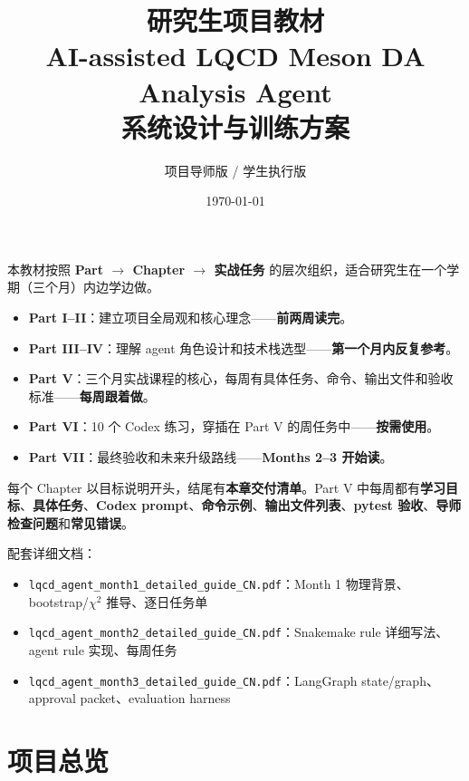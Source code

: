 \documentclass[11pt,a4paper,fontset=fandol]{ctexart}
\title{\bfseries 研究生项目教材\\[4pt]
AI-assisted LQCD Meson DA Analysis Agent\\[4pt]
系统设计与训练方案}
\author{项目导师版 / 学生执行版}
\date{\today}
\begin{document}
\maketitle

\begin{tcolorbox}[colback=blue!3!white,colframe=blue!50!black,title=如何使用本教材]
本教材按照 \textbf{Part $\to$ Chapter $\to$ 实战任务} 的层次组织，适合研究生在一个学期（三个月）内边学边做。

\begin{itemize}
  \item \textbf{Part I--II}：建立项目全局观和核心理念——\textbf{前两周读完}。
  \item \textbf{Part III--IV}：理解 agent 角色设计和技术栈选型——\textbf{第一个月内反复参考}。
  \item \textbf{Part V}：三个月实战课程的核心，每周有具体任务、命令、输出文件和验收标准——\textbf{每周跟着做}。
  \item \textbf{Part VI}：10 个 Codex 练习，穿插在 Part V 的周任务中——\textbf{按需使用}。
  \item \textbf{Part VII}：最终验收和未来升级路线——\textbf{Months 2--3 开始读}。
\end{itemize}

每个 Chapter 以目标说明开头，结尾有\textbf{本章交付清单}。Part V 中每周都有\textbf{学习目标}、\textbf{具体任务}、\textbf{Codex prompt}、\textbf{命令示例}、\textbf{输出文件列表}、\textbf{pytest 验收}、\textbf{导师检查问题}和\textbf{常见错误}。

配套详细文档：
\begin{itemize}
  \item \texttt{lqcd\_agent\_month1\_detailed\_guide\_CN.pdf}：Month 1 物理背景、bootstrap/$\chi^2$ 推导、逐日任务单
  \item \texttt{lqcd\_agent\_month2\_detailed\_guide\_CN.pdf}：Snakemake rule 详细写法、agent rule 实现、每周任务
  \item \texttt{lqcd\_agent\_month3\_detailed\_guide\_CN.pdf}：LangGraph state/graph、approval packet、evaluation harness
\end{itemize}
\end{tcolorbox}

\tableofcontents
\newpage

\part{项目总览}
\end{document}
